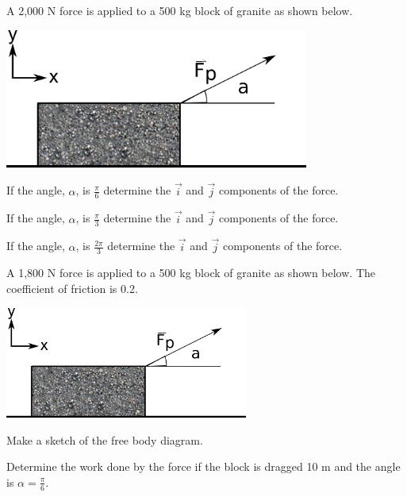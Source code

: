 


\begin{problem}
\item A 2,000 N force is applied to a 500 kg block of granite as shown
  below.

  \includegraphics[width=10cm]{ink/week7/dragBlock}

  \begin{subproblem}
  \item If the angle, $\alpha$, is $\frac{\pi}{6}$ determine the
    $\vec{i}$ and $\vec{j}$ components of the force.
    \vfill
  \item If the angle, $\alpha$, is $\frac{\pi}{3}$ determine the
    $\vec{i}$ and $\vec{j}$ components of the force.
    \vfill
  \item If the angle, $\alpha$, is $\frac{2\pi}{3}$ determine the
    $\vec{i}$ and $\vec{j}$ components of the force.
    \vfill
  \end{subproblem}

  \clearpage

\item A 1,800 N force is applied to a 500 kg block of granite as
  shown below. The coefficient of friction is 0.2.

  \includegraphics[width=8cm]{ink/week7/dragBlock}

  \begin{subproblem}
    \item Make a sketch of the free body diagram.
      \vspace{6em}
    \item Determine the work done by the force if the block is dragged
      10 m and the angle is $\alpha=\frac{\pi}{6}$.  


\end{subproblem}
\end{problem}
